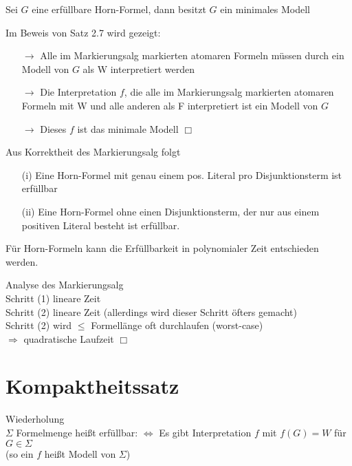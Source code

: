 Sei $G$ eine erfüllbare Horn-Formel, dann besitzt $G$ ein minimales Modell

\beweis{}
Im Beweis von Satz 2.7 wird gezeigt:
\begin{itemize}
\item[$\rightarrow$] Alle im Markierungsalg markierten atomaren Formeln müssen durch ein Modell von $G$ als W interpretiert werden

\item[$\rightarrow$] Die Interpretation $f$, die alle im Markierungsalg markierten atomaren Formeln mit W und alle anderen als F interpretiert ist ein Modell von $G$

\item[$\rightarrow$] Dieses $f$ ist das minimale Modell $\Box$
\end{itemize}

\bemerkung{}
Aus Korrektheit des Markierungsalg folgt
\begin{enumerate}
\item[(i)] Eine Horn-Formel mit genau einem pos. Literal pro Disjunktionsterm ist erfüllbar

\item[(ii)] Eine Horn-Formel ohne einen Disjunktionsterm, der nur aus einem positiven Literal besteht ist erfüllbar.
\end{enumerate}

Für Horn-Formeln kann die Erfüllbarkeit in polynomialer Zeit entschieden werden.

\beweis{}
Analyse des Markierungsalg\\
Schritt (1) lineare Zeit\\
Schritt (2) lineare Zeit (allerdings wird dieser Schritt öfters gemacht)\\
Schritt (2) wird $\leq$ Formellänge oft durchlaufen (worst-case)\\
$\Rightarrow$ quadratische Laufzeit $\Box$

\newpage

\section{Kompaktheitssatz}

Wiederholung\\
$\Sigma$ Formelmenge heißt erfüllbar: $\Leftrightarrow$ Es gibt Interpretation $f$ mit $f(G) = W$ für $G \in \Sigma$\\
(so ein $f$ heißt Modell von $\Sigma$)\\

